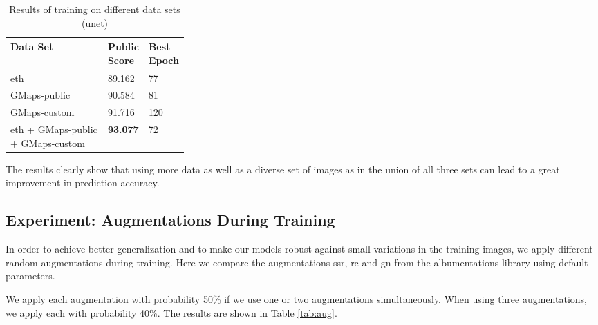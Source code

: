 \begin{table}[h!]
    \centering
    \begin{tabular}{l|p{0.15\linewidth}|p{0.15\linewidth}}
         Data Set & Public Score & Best Epoch  \\ \hline
         \acrshort{eth} & 89.162 & 77 \\
         GMaps-public & 90.584 & 81 \\
         GMaps-custom & 91.716 & 120 \\ %
         \acrshort{eth} + GMaps-public + GMaps-custom & \textbf{93.077} & 72 \\ %
    \end{tabular}
    \caption{Results of training on different data sets (\acrshort{unet})}
    \label{tab:datasets}
    \vspace{-3mm}
\end{table}


The results clearly show that using more data as well as a diverse set of images as in the union of all three sets can lead to a great improvement in prediction accuracy.


\subsection{Experiment: Augmentations During Training}

In order to achieve better generalization and to make our models robust against small variations in the training images, we apply different random augmentations during training. Here we compare the augmentations \acrfull{ssr}, \acrfull{rc} and \acrfull{gn} from the albumentations library \cite{albumentations} using default parameters.


We apply each augmentation with probability 50\% if we use one or two augmentations simultaneously. When using three augmentations, we apply each with probability 40\%. The results are shown in Table \ref{tab:aug}.

